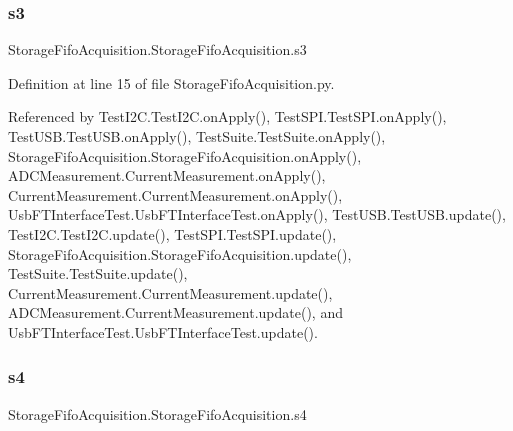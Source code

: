 \mbox{\label{classStorageFifoAcquisition_1_1StorageFifoAcquisition_a3f30efaf073827ff9317c275dcaafd55}} 
\subsubsection{\texorpdfstring{s3}{s3}}
{\footnotesize\ttfamily Storage\+Fifo\+Acquisition.\+Storage\+Fifo\+Acquisition.\+s3}



Definition at line 15 of file Storage\+Fifo\+Acquisition.\+py.



Referenced by Test\+I2\+C.\+Test\+I2\+C.\+on\+Apply(), Test\+S\+P\+I.\+Test\+S\+P\+I.\+on\+Apply(), Test\+U\+S\+B.\+Test\+U\+S\+B.\+on\+Apply(), Test\+Suite.\+Test\+Suite.\+on\+Apply(), Storage\+Fifo\+Acquisition.\+Storage\+Fifo\+Acquisition.\+on\+Apply(), A\+D\+C\+Measurement.\+Current\+Measurement.\+on\+Apply(), Current\+Measurement.\+Current\+Measurement.\+on\+Apply(), Usb\+F\+T\+Interface\+Test.\+Usb\+F\+T\+Interface\+Test.\+on\+Apply(), Test\+U\+S\+B.\+Test\+U\+S\+B.\+update(), Test\+I2\+C.\+Test\+I2\+C.\+update(), Test\+S\+P\+I.\+Test\+S\+P\+I.\+update(), Storage\+Fifo\+Acquisition.\+Storage\+Fifo\+Acquisition.\+update(), Test\+Suite.\+Test\+Suite.\+update(), Current\+Measurement.\+Current\+Measurement.\+update(), A\+D\+C\+Measurement.\+Current\+Measurement.\+update(), and Usb\+F\+T\+Interface\+Test.\+Usb\+F\+T\+Interface\+Test.\+update().

\mbox{\label{classStorageFifoAcquisition_1_1StorageFifoAcquisition_acd6d6a44c3e9a6444997cc88748d7ab7}} 
\subsubsection{\texorpdfstring{s4}{s4}}
{\footnotesize\ttfamily Storage\+Fifo\+Acquisition.\+Storage\+Fifo\+Acquisition.\+s4}



